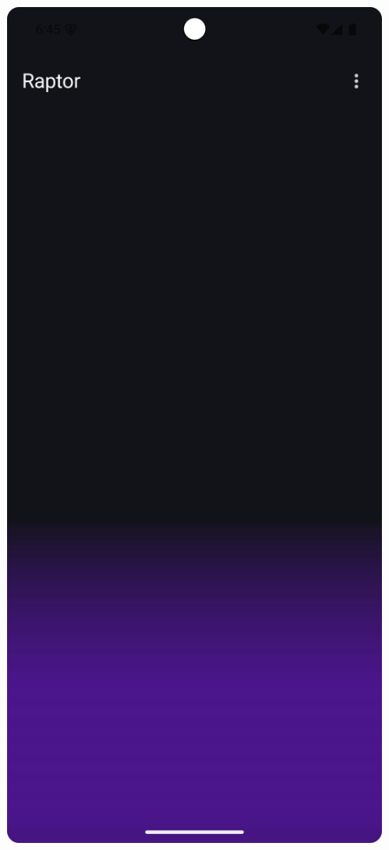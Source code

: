 \begin{figure}[H]
	\caption{}
	\label{fig:test_fingerprint}
\end{figure}

\begin{figure}[H]
	\centering
	\includegraphics[width=1\textwidth]{images/tutorial_autorzy_pusty.png}
	\caption{}
	\label{fig:test_autorzy_pusty}
\end{figure}

